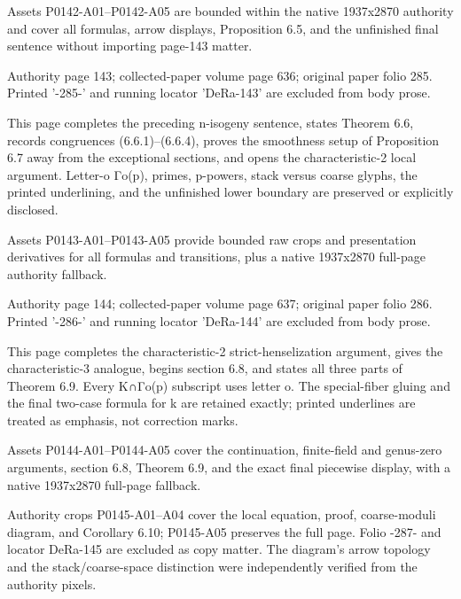 \documentclass[11pt,a4paper]{article}
\begin{document}
Assets P0142-A01--P0142-A05 are bounded within the native 1937x2870 authority and cover all formulas, arrow displays, Proposition 6.5, and the unfinished final sentence without importing page-143 matter.


\par\medskip
\hypertarget{D018-P0143}{}
\par\smallskip
Authority page 143; collected-paper volume page 636; original paper folio 285. Printed '-285-' and running locator 'DeRa-143' are excluded from body prose.

This page completes the preceding n-isogeny sentence, states Theorem 6.6, records congruences (6.6.1)--(6.6.4), proves the smoothness setup of Proposition 6.7 away from the exceptional sections, and opens the characteristic-2 local argument. Letter-o Γ\textunderscore{}o(p), primes, p-powers, stack versus coarse glyphs, the printed underlining, and the unfinished lower boundary are preserved or explicitly disclosed.

Assets P0143-A01--P0143-A05 provide bounded raw crops and presentation derivatives for all formulas and transitions, plus a native 1937x2870 full-page authority fallback.


\par\medskip
\hypertarget{D018-P0144}{}
\par\smallskip
Authority page 144; collected-paper volume page 637; original paper folio 286. Printed '-286-' and running locator 'DeRa-144' are excluded from body prose.

This page completes the characteristic-2 strict-henselization argument, gives the characteristic-3 analogue, begins section 6.8, and states all three parts of Theorem 6.9. Every K∩Γ\textunderscore{}o(p) subscript uses letter o. The special-fiber gluing and the final two-case formula for k are retained exactly; printed underlines are treated as emphasis, not correction marks.

Assets P0144-A01--P0144-A05 cover the continuation, finite-field and genus-zero arguments, section 6.8, Theorem 6.9, and the exact final piecewise display, with a native 1937x2870 full-page fallback.


\par\medskip
\hypertarget{D018-P0145}{}
\par\smallskip
Authority crops P0145-A01--A04 cover the local equation, proof, coarse-moduli diagram, and Corollary 6.10; P0145-A05 preserves the full page. Folio -287- and locator DeRa-145 are excluded as copy matter. The diagram's arrow topology and the stack/coarse-space distinction were independently verified from the authority pixels.
\end{document}
